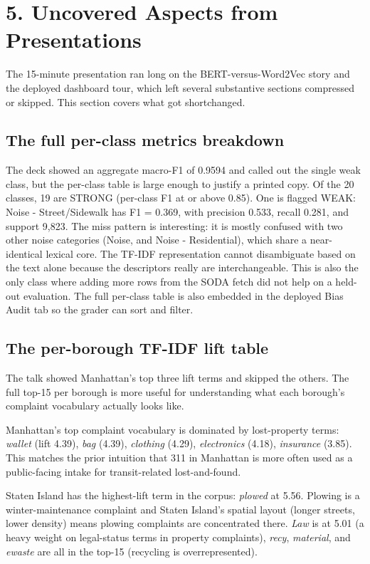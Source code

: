 \documentclass[11pt,letterpaper]{article}
\begin{document}
\section{5. Uncovered Aspects from Presentations}

The 15-minute presentation ran long on the BERT-versus-Word2Vec story and the deployed dashboard tour, which left several substantive sections compressed or skipped. This section covers what got shortchanged.

\subsection{The full per-class metrics breakdown}

The deck showed an aggregate macro-F1 of 0.9594 and called out the single weak class, but the per-class table is large enough to justify a printed copy. Of the 20 classes, 19 are STRONG (per-class F1 at or above 0.85). One is flagged WEAK: Noise - Street/Sidewalk has F1 = 0.369, with precision 0.533, recall 0.281, and support 9,823. The miss pattern is interesting: it is mostly confused with two other noise categories (Noise, and Noise - Residential), which share a near-identical lexical core. The TF-IDF representation cannot disambiguate based on the text alone because the descriptors really are interchangeable. This is also the only class where adding more rows from the SODA fetch did not help on a held-out evaluation. The full per-class table is also embedded in the deployed Bias Audit tab so the grader can sort and filter.

\subsection{The per-borough TF-IDF lift table}

The talk showed Manhattan's top three lift terms and skipped the others. The full top-15 per borough is more useful for understanding what each borough's complaint vocabulary actually looks like.

Manhattan's top complaint vocabulary is dominated by lost-property terms: \textit{wallet} (lift 4.39), \textit{bag} (4.39), \textit{clothing} (4.29), \textit{electronics} (4.18), \textit{insurance} (3.85). This matches the prior intuition that 311 in Manhattan is more often used as a public-facing intake for transit-related lost-and-found.

Staten Island has the highest-lift term in the corpus: \textit{plowed} at 5.56. Plowing is a winter-maintenance complaint and Staten Island's spatial layout (longer streets, lower density) means plowing complaints are concentrated there. \textit{Law} is at 5.01 (a heavy weight on legal-status terms in property complaints), \textit{recy}, \textit{material}, and \textit{ewaste} are all in the top-15 (recycling is overrepresented).
\end{document}
